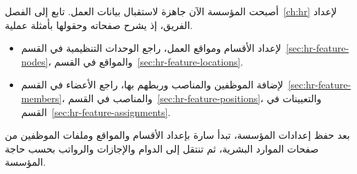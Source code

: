 أصبحت المؤسسة الآن جاهزة لاستقبال بيانات العمل. تابع إلى الفصل~\ref{ch:hr} لإعداد الفريق، إذ يشرح صفحاته وحقولها بأمثلة عملية.

\begin{itemize}
  \item لإعداد الأقسام ومواقع العمل، راجع الوحدات التنظيمية في القسم~\ref{sec:hr-feature-nodes}، والمواقع في القسم~\ref{sec:hr-feature-locations}.
  \item لإضافة الموظفين والمناصب وربطهم بها، راجع الأعضاء في القسم~\ref{sec:hr-feature-members}، والمناصب في القسم~\ref{sec:hr-feature-positions}، والتعيينات في القسم~\ref{sec:hr-feature-assignments}.
\end{itemize}

\begin{rcnote}
بعد حفظ إعدادات المؤسسة، تبدأ سارة بإعداد الأقسام والمواقع وملفات الموظفين من صفحات الموارد البشرية، ثم تنتقل إلى الدوام والإجازات والرواتب بحسب حاجة المؤسسة.
\end{rcnote}
